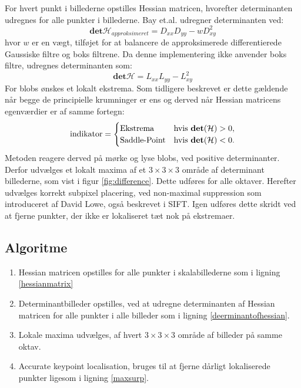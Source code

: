 For hvert punkt i billederne opstilles Hessian matricen, hvorefter determinanten udregnes for alle punkter i billederne. Bay et.al. udregner determinanten ved:
\begin{equation}
\textbf{det}\mathcal{H}_{approksimeret} = D_{xx}D_{yy}-wD_{xy}^2
\label{deerminantofhessian}
\end{equation}
hvor $w$ er en vægt, tilføjet for at balancere de approksimerede differentierede Gaussiske filtre og boks filtrene. Da denne implementering ikke anvender boks filtre, udregnes determinanten som:
\begin{equation}
\textbf{det}\mathcal{H} = L_{xx}L_{yy}-L_{xy}^2
\label{deerminantofhessian}
\end{equation}
For blobs ønskes et lokalt ekstrema. Som tidligere beskrevet er dette gældende når begge de principielle krumninger er ens og derved når Hessian matricens egenværdier er af samme fortegn:
\begin{equation}
\begin{split}
\text{indikator} = 
\begin{cases}
\text{Ekstrema}& \text{hvis } \bold{det}(\mathcal{H}) > 0,  \\
\text{Saddle-Point} & \text{hvis } \bold{det}(\mathcal{H}) < 0.
\end{cases}
\end{split}
\label{detman}
\end{equation}
Metoden reagere derved på mørke og lyse blobs, ved positive determinanter. Derfor udvælges et lokalt maxima af et $3\times3\times3$ område af determinant billederne, som vist i figur \ref{fig:difference}. Dette udføres for alle oktaver. Herefter udvælges korrekt subpixel placering, ved non-maximal suppression som introduceret af David Lowe, også beskrevet i SIFT. Igen udføres dette skridt ved at fjerne punkter, der ikke er lokaliseret tæt nok på ekstremaer.
\subsection*{Algoritme}
\begin{enumerate}
\item {Hessian matricen opstilles for alle punkter i skalabillederne som i ligning \eqref{hessianmatrix}}
\item Determinantbilleder opstilles, ved at udregne determinanten af Hessian matricen for alle punkter i alle billeder som i ligning \eqref{deerminantofhessian}.
\item Lokale maxima udvælges, af hvert $3\times3\times3$ område af billeder på samme oktav.
\item Accurate keypoint localisation, bruges til at fjerne dårligt lokaliserede punkter ligesom i ligning \eqref{maxsurp}.
\end{enumerate}